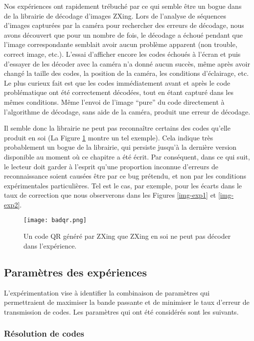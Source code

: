 Nos expériences ont rapidement trébuché par ce qui semble être un bogue dans de la librairie de décodage d'images ZXing. Lors de l'analyse de séquences d'images capturées par la caméra pour rechercher des erreurs de décodage, nous avons découvert que pour un nombre de fois, le décodage a échoué pendant que l'image correspondante semblait avoir aucun problème apparent (non trouble, correct image, etc.). L'essai d'afficher encore les codes échoués à l'écran et puis d'essayer de les décoder avec la caméra n'a donné aucun succès, même après avoir changé la taille des codes, la position de la caméra, les conditions d'éclairage, etc. Le plus curieux fait est que les codes immédiatement avant et après le code problématique ont été correctement décodées, tout en étant capturé dans les mêmes conditions. Même l'envoi de l'image ``pure''  du code directement à l'algorithme de décodage, sans aide de la caméra, produit une erreur de décodage.

Il semble donc la librairie ne peut pas reconnaître certains des codes qu'elle produit en soi (La Figure \ref{fig:qr:bad-code} montre un tel exemple). Cela indique très probablement un bogue de la librairie, qui persiste jusqu'à la dernière version disponible au moment où ce chapitre a été écrit. Par conséquent, dans ce qui suit, le lecteur doit garder à l'esprit qu'une proportion inconnue d'erreurs de reconnaissance soient causées être par ce bug prétendu, et non par les conditions expérimentales particulières. Tel est le cas, par exemple, pour les écarts dans le taux de correction que nous observerons dans les Figures \ref{img-exp1} et \ref{img-exp2}.

\begin{figure}
\centering
\texttt{[image: badqr.png]}
\caption{Un code QR généré par ZXing que ZXing en soi ne peut pas décoder dans l'expérience.}
\label{fig:qr:bad-code}
\end{figure}

\subsection{Paramètres des expériences}

L'expérimentation vise à identifier la combinaison de paramètres qui permettraient de maximiser la bande passante et de  minimiser le taux d'erreur de transmission de codes. Les paramètres qui ont été considérés sont les suivants.

\subsubsection{Résolution de codes}

